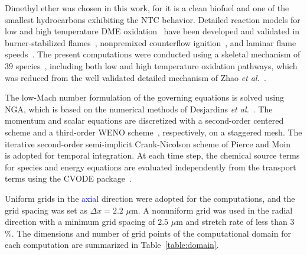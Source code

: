 \documentclass[review,3p,times]{elsarticle}
\begin{document}
Dimethyl ether was chosen in this work, for it is a clean biofuel and one of the smallest hydrocarbons exhibiting the NTC behavior. Detailed reaction models for low and high temperature DME oxidation~\cite{curran98,fischer00,curran00,zhao08} have been developed and validated in burner-stabilized flames~\cite{kaiser00}, nonpremixed counterflow ignition~\cite{zheng05}, and laminar flame speeds~\cite{qin05}.  The present computations were conducted using a skeletal mechanism of $39$ species~\cite{bhagatwala15}, including both low and high temperature oxidation pathways, which was reduced from the well validated detailed mechanism of Zhao \emph{et al.}~\cite{zhao08}. 

The low-Mach number formulation of the governing equations is solved using NGA, which is based on the numerical methods of Desjardins \emph{et al.}~\cite{desjardins08}.  The momentum and scalar equations are discretized with a second-order centered scheme and a third-order WENO scheme~\cite{liu94}, respectively, on a staggered mesh.  The iterative second-order semi-implicit Crank-Nicolson scheme of Pierce and Moin~\cite{pierce01} is adopted for temporal integration.  At each time step, the chemical source terms for species and energy equations are evaluated independently from the transport terms using the CVODE package~\cite{cohen96}.

Uniform grids in the \textcolor{blue}{axial} direction were adopted for the computations, and the grid spacing was set as $\Delta x = 2.2$ $\mu$m.  A nonuniform grid was used in the radial direction with a minimum grid spacing of $2.5$ $\mu$m and stretch rate of less than $3$\%.  The dimensions and number of grid points of the computational domain for each computation are summarized in Table~\ref{table:domain}.

\begin{table}
  \caption{Computational domain and number of grid points.}
  \label{table:domain}
  \centering
  \normalsize
\end{table}
\end{document}
